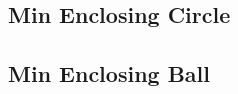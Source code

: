 \documentclass[a4paper,10pt,twocolumn,oneside]{article}
\begin{document}
% 

% 

\subsection{Min Enclosing Circle}


\subsection{Min Enclosing Ball}


%

% 

% 

%

% 

% 
\end{document}
